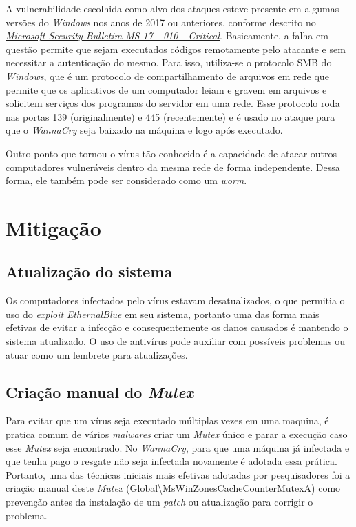 \documentclass[12pt]{article}
\begin{document}
A vulnerabilidade escolhida como alvo dos ataques esteve presente em algumas versões do \textit{Windows} nos anos de 2017 ou anteriores, conforme descrito no \href{https://docs.microsoft.com/pt-br/security-updates/securitybulletins/2017/ms17-010}{\textit{Microsoft Security Bulletim MS 17 - 010 - Critical}}. Basicamente, a falha em questão permite que sejam executados códigos remotamente pelo atacante e sem necessitar a autenticação do mesmo. Para isso, utiliza-se o protocolo SMB do \textit{Windows}, que é um protocolo de compartilhamento de arquivos em rede que permite que os aplicativos de um computador leiam e gravem em arquivos e solicitem serviços dos programas do servidor em uma rede. Esse protocolo roda nas portas 139 (originalmente) e 445 (recentemente) e é usado no ataque para que o \textit{WannaCry} seja baixado na máquina e logo após executado.

Outro ponto que tornou o vírus tão conhecido é a capacidade de atacar outros computadores vulneráveis dentro da mesma rede de forma independente. Dessa forma, ele também pode ser considerado como um \textit{worm}.

\section{Mitigação}

\subsection{Atualização do sistema}

Os computadores infectados pelo vírus estavam desatualizados, o que permitia o uso do \textit{exploit} \textit{EthernalBlue} em seu sistema, portanto uma das forma mais efetivas de evitar a infecção e consequentemente os danos causados é mantendo o sistema atualizado. O uso de antivírus pode auxiliar com possíveis problemas ou atuar como um lembrete para atualizações.

\subsection{Criação manual do \textit{Mutex}}

Para evitar que um vírus seja executado múltiplas vezes em uma maquina, é pratica comum de vários \textit{malwares} criar um \textit{Mutex} único e parar a execução caso esse \textit{Mutex} seja encontrado. No \textit{WannaCry}, para que uma máquina já infectada e que tenha pago o resgate não seja infectada novamente é adotada essa prática.
Portanto, uma das técnicas iniciais mais efetivas adotadas por pesquisadores foi a criação manual deste \textit{Mutex} (Global\textbackslash MsWinZonesCacheCounterMutexA) como prevenção antes da instalação de um \textit{patch} ou atualização para corrigir o problema.
\end{document}

